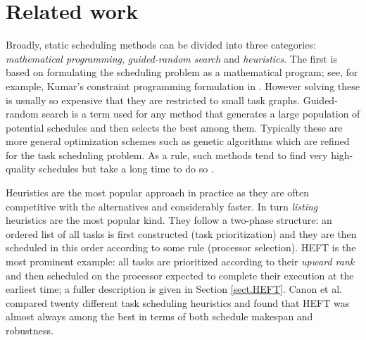 \documentclass[runningheads]{llncs}
\begin{document}
\section{Related work}
\label{sect.lit_review}

Broadly, static scheduling methods can be divided into three categories: {\em mathematical programming}, {\em guided-random search} and {\em heuristics}. The first is based on formulating the scheduling problem as a mathematical program; see, for example, Kumar's constraint programming formulation in \cite{kumar:tel-01538516}. However solving these is usually so expensive that they are restricted to small task graphs. Guided-random search is a term used for any method that generates a large population of potential schedules and then selects the best among them. Typically these are more general optimization schemes such as genetic algorithms which are refined for the task scheduling problem. As a rule, such methods tend to find very high-quality schedules but take a long time to do so \cite{BRAUN2001810}. 

Heuristics are the most popular approach in practice as they are often competitive with the alternatives and considerably faster. In turn {\em listing} heuristics are the most popular kind. They follow a two-phase structure: an ordered list of all tasks is first constructed (task prioritization) and they are then scheduled in this order according to some rule (processor selection). HEFT is the most prominent example: all tasks are prioritized according to their {\em upward rank} and then scheduled on the processor expected to complete their execution at the earliest time; a fuller description is given in Section \ref{sect.HEFT}. Canon et al. \cite{canon2008comparative} compared twenty different task scheduling heuristics and found that HEFT was almost always among the best in terms of both schedule makespan and robustness.

\end{document}
